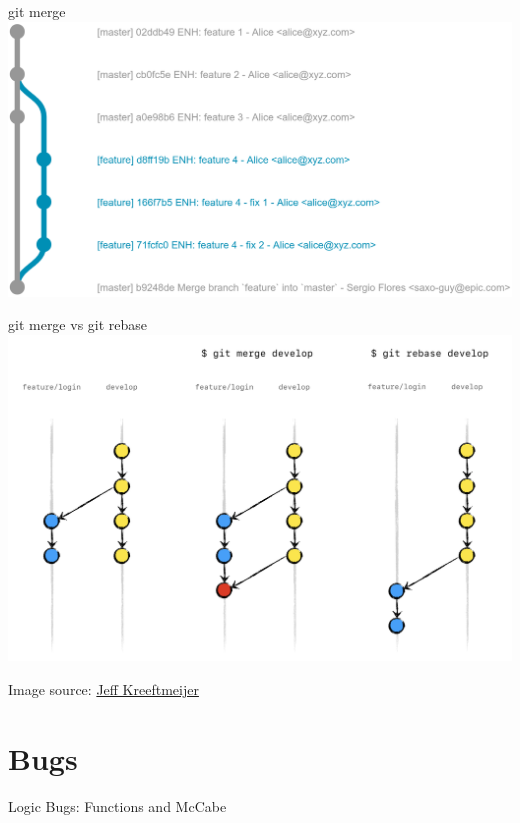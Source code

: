\documentclass{beamer}
\begin{document}
\begin{frame}{git merge}
    \includegraphics[width=1.0\textwidth,height=0.5\textheight,keepaspectratio]{graphics/git-merge.png}
\end{frame}

\begin{frame}{git merge vs git rebase}
    \includegraphics[width=1.0\textwidth,height=0.8\textheight,keepaspectratio]{graphics/git-rebase.png}

    {\small Image source: \href{https://jeffkreeftmeijer.com/git-rebase/}{Jeff Kreeftmeijer}}
\end{frame}


\section{Bugs}
\begin{frame}{Logic Bugs: Functions and McCabe}
\inputminted[linenos,
             numbersep=7pt,
             fontsize=\footnotesize, tabsize=4]{python}{src/sieve-v1.py}
\end{frame}
\end{document}
